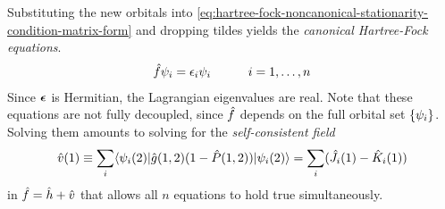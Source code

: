 \documentclass[11pt]{article}
\numberwithin{equation}{section}
\begin{document}
Substituting the new orbitals into \cref{eq:hartree-fock-noncanonical-stationarity-condition-matrix-form} and dropping tildes yields the \textit{canonical Hartree-Fock equations}.
\begin{align*}
  \hat{f}\psi _i
=
  \epsilon _i\psi _i
\hspace{30pt}
  i=1,\ldots,n
\end{align*}
Since $\bm{\ev}$ is Hermitian, the Lagrangian eigenvalues are real.
Note that these equations are not fully decoupled, since $\hat{f}$ depends on the full orbital set $\{\psi _i\}$.
Solving them amounts to solving for the {\it self-consistent field} 
\begin{align}
  \hat{v}(1)
\equiv
\sum_i
  \langle\psi _i(2)|\hat{g}(1,2)(1-\hat{P}(1,2))|\psi _i(2)\rangle
=
\sum_i
  (\hat{J}_i(1)-\hat{K}_i(1))
\end{align}
in $\hat{f}=\hat{h}+\hat{v}$ that allows all $n$ equations to hold true simultaneously.


\newpage
\appendix
\end{document}
